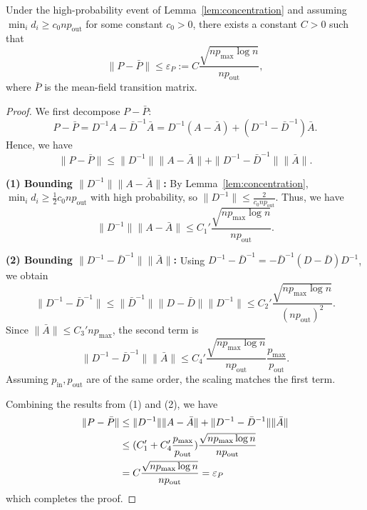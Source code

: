 



\begin{lemma}
\label{lem:transition}
Under the high-probability event of Lemma~\ref{lem:concentration} and assuming $\min_i d_i \ge c_0 n p_{\mathrm{out}}$ for some constant $c_0>0$,
there exists a constant $C>0$ such that
\begin{equation}
    \label{eq:epsinf}
    \|P-\bar P\| \le \varepsilon_P := C\frac{\sqrt{n p_{\max}\log n}}{n p_{\mathrm{out}}},
\end{equation}
where $\bar P$ is the mean-field transition matrix.
\end{lemma}


\begin{proof}
We first decompose $P - \bar P$:
\[
P - \bar P = D^{-1}A - \bar D^{-1}\bar A = D^{-1}(A-\bar A) + (D^{-1}-\bar D^{-1})\bar A.
\]
Hence, we have
\[
\|P-\bar P\| \le \|D^{-1}\|\|A-\bar A\| + \|D^{-1}-\bar D^{-1}\|\|\bar A\|.
\]

\noindent
\textbf{(1) Bounding $\|D^{-1}\|\|A-\bar A\|$:}  
By Lemma~\ref{lem:concentration}, $\min_i d_i \ge \frac{1}{2}c_0 n p_{\mathrm{out}}$ with high probability, so $\|D^{-1}\|\le \frac{2}{c_0 n p_{\mathrm{out}}}$.  Thus, we have
\[
\|D^{-1}\|\|A-\bar A\|
\le C_1'\frac{\sqrt{n p_{\max}\log n}}{n p_{\mathrm{out}}}.
\]

\noindent
\textbf{(2) Bounding $\|D^{-1}-\bar D^{-1}\|\|\bar A\|$:}  Using $D^{-1}-\bar D^{-1} = -\bar D^{-1}(D-\bar D)D^{-1}$, we obtain
\[
\|D^{-1}-\bar D^{-1}\|
\le \|\bar D^{-1}\|\|D-\bar D\|\|D^{-1}\|
\le C_2'\frac{\sqrt{n p_{\max}\log n}}{(n p_{\mathrm{out}})^2}.
\]
Since $\|\bar A\|\le C_3' n p_{\max}$, the second term is
\[
\|D^{-1}-\bar D^{-1}\|\|\bar A\|
\le C_4'\frac{\sqrt{n p_{\max}\log n}}{n p_{\mathrm{out}}}
\frac{p_{\max}}{p_{\mathrm{out}}}.
\]
Assuming $p_{\mathrm{in}},p_{\mathrm{out}}$ are of the same order,  the scaling matches the first term. 

\noindent Combining the results from (1) and (2), we have 
\begin{align}
    \notag \|P-\bar P\| &\le \|D^{-1}\|\|A-\bar A\| + \|D^{-1}-\bar D^{-1}\|\|\bar A\| \\
    \notag &\le (C_1' +C_4'\frac{p_{\max}}{p_{\mathrm{out}}}) \frac{\sqrt{n p_{\max}\log n}}{n p_{\mathrm{out}}}  \\
    \notag &= C\frac{\sqrt{n p_{\max}\log n}}{n p_{\mathrm{out}}} =  \varepsilon_P
\end{align}
which completes the proof.
\end{proof}






